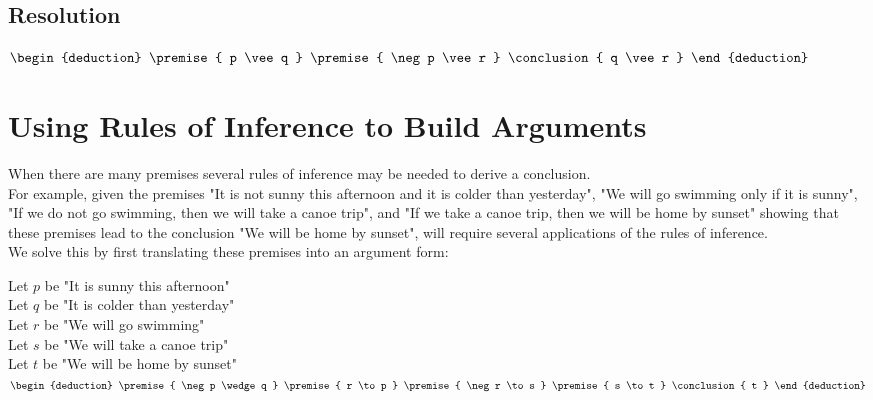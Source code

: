 \documentclass[12pt letter]{report}
\begin{document}
\subsection{Resolution}
\begin{math}
  \begin{deduction}
    \premise{ p \vee q }
    \premise{ \neg p \vee r }
    \conclusion{ q \vee r }
  \end{deduction}
\end{math}

\section{Using Rules of Inference to Build Arguments}

When there are many premises several rules of inference may be needed to derive a conclusion. \\

For example, given the premises "It is not sunny this afternoon and it is colder than yesterday", "We will go swimming only if it is sunny",
"If we do not go swimming, then we will take a canoe trip", and "If we take a canoe trip, then we will be home by
sunset" showing that these premises lead to the conclusion "We will be home by sunset", will require several
applications of the rules of inference.\\

We solve this by first translating these premises into an argument form:

\noindent Let $p$ be "It is sunny this afternoon"\\

\noindent Let $q$ be "It is colder than yesterday"\\

\noindent Let $r$ be "We will go swimming"\\

\noindent Let $s$ be "We will take a canoe trip"\\

\noindent Let $t$ be "We will be home by sunset"\\

\begin{math}
  \begin{deduction}
    \premise{ \neg p \wedge q }
    \premise{ r \to p }
    \premise{ \neg r \to s }
    \premise{ s \to t }
    \conclusion{ t }
  \end{deduction}
\end{math}
\end{document}
